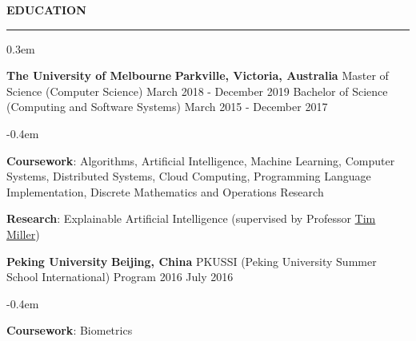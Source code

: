 \documentclass{cv}
\begin{document}
 \textbf{EDUCATION}
\sectionlineskip
\hrule
\begin{list}{}{\setlength{\leftmargin}{0em}}
\itemsep 0.3em
\item
    \textbf{The University of Melbourne} \hfill \textbf{Parkville, Victoria, Australia}%
    \vspace{0.1em} \newline
    {Master of Science (Computer Science)} \hfill {March 2018 - December 2019}%
    \newline
    {Bachelor of Science (Computing and Software Systems)} \hfill {March 2015 - December 2017}%
    \begin{list}{\raisebox{0.2em}{\tiny$\bullet$} \hspace{0em}}{\setlength{\leftmargin}{2.0em}}
        \itemsep -0.4em \vspace{-0.4em}
        \item \textbf{Coursework}: Algorithms, Artificial Intelligence, Machine Learning, Computer Systems, Distributed Systems, Cloud Computing, Programming Language Implementation, Discrete Mathematics and Operations Research
        \item \textbf{Research}: Explainable Artificial Intelligence (supervised by Professor \href{https://eecs.uq.edu.au/profile/9477/tim-miller}{Tim Miller})
    \end{list}
\item
    \textbf{Peking University} \hfill \textbf{Beijing, China}%
    \vspace{0.1em} \newline 
    {PKUSSI (Peking University Summer School International) Program 2016} \hfill {July 2016}%
    \begin{list}{\raisebox{0.2em}{\tiny$\bullet$} \hspace{0em}}{\setlength{\leftmargin}{2.0em}}
        \itemsep -0.4em \vspace{-0.4em}
        \item \textbf{Coursework}: Biometrics
    \end{list}
\end{list}

\end{document}
